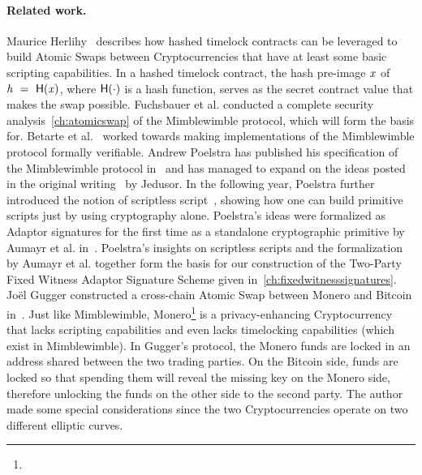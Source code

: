 \paragraph{Related work.} Maurice Herlihy~\cite{herlihy2018atomic} describes how hashed timelock contracts can be leveraged to build Atomic Swaps between Cryptocurrencies that have at least some basic scripting capabilities.
In a hashed timelock contract, the hash pre-image $\mathit{x}$ of $\mathit{h} ~=~ \mathsf{H} (\mathit{x})$, where $\mathsf{H} (\cdot)$ is a hash function, serves as the secret contract value that makes the swap possible.
Fuchsbauer et al. conducted a complete security analysis~\cref{ch:atomicswap} of the Mimblewimble protocol, which will form the basis for.
Betarte et al.~\cite{betarte2019towards} worked towards making implementations of the Mimblewimble protocol formally verifiable.
Andrew Poelstra has published his specification of the Mimblewimble protocol in~\cite{poelstra2016mimblewimble} and has managed to expand on the ideas posted in the original writing~\cite{jedusor2016mimblewimble} by Jedusor.
In the following year, Poelstra further introduced the notion of scriptless script~\cite{poelstra2017scriptless}, showing how one can build primitive scripts just by using cryptography alone.
Poelstra's ideas were formalized as Adaptor signatures for the first time as a standalone cryptographic primitive by Aumayr et al. in~\cite{aumayr2020bitcoinchannels}.
Poelstra's insights on scriptless scripts and the formalization by Aumayr et al. together form the basis for our construction of the Two-Party Fixed Witness Adaptor Signature Scheme given in~\cref{ch:fixedwitnesssignatures}.
Joël Gugger constructed a cross-chain Atomic Swap between Monero and Bitcoin in~\cite{gugger2020bitcoin}.
Just like Mimblewimble, Monero\footnote{\urlmonero} is a privacy-enhancing Cryptocurrency that lacks scripting capabilities and even lacks timelocking capabilities (which exist in Mimblewimble).
In Gugger's protocol, the Monero funds are locked in an address shared between the two trading parties.
On the Bitcoin side, funds are locked so that spending them will reveal the missing key on the Monero side, therefore unlocking the funds on the other side to the second party.
The author made some special considerations since the two Cryptocurrencies operate on two different elliptic curves.